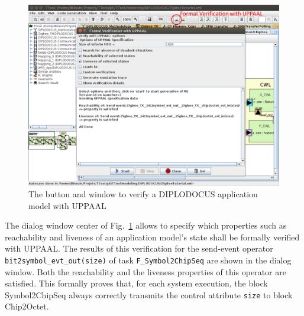 \documentclass{llncs}
\newcommand{\screenshotsize}{1.0\textwidth}
\begin{document}
\begin{figure}[!htbp]
	\centering
	\includegraphics[width=\screenshotsize]{figures/screenshot/UPPAAL1.png}
	\caption{The button and window to verify a DIPLODOCUS application model with
	UPPAAL}
	\label{fig:UPPAAL1}
\end{figure}
%
The dialog window center of Fig.~\ref{fig:UPPAAL1} allows to specify which
properties such as reachability and liveness of an application model's state
shall be formally verified  with UPPAAL. The results of this verification for
the send-event operator \texttt{bit2symbol\_evt\_out(size)} of task
\texttt{F\_Symbol2ChipSeq} are shown in the dialog window.
%
%
%
Both the reachability and the liveness properties of this operator are
satisfied. This formally proves that, for each system execution, the block Symbol2ChipSeq always correctly
transmits the control attribute \texttt{size} to block Chip2Octet.
%
\end{document}
